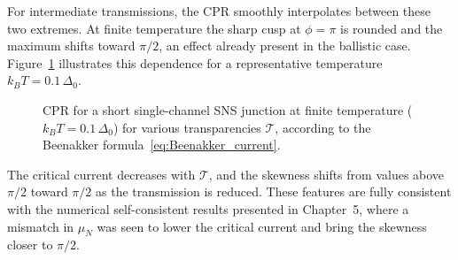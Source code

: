 \documentclass[11pt,a4paper,twoside,openany]{report}
\begin{document}
For intermediate transmissions, the CPR smoothly interpolates between these two
extremes.  At finite temperature the sharp cusp at $\phi=\pi$ is rounded and the
maximum shifts toward $\pi/2$, an effect already present in the ballistic case.
Figure~\ref{fig:cpr_finite_T} illustrates this dependence for a representative
temperature $k_B T = 0.1\,\Delta_0$.

\begin{figure}[H]
  \centering
  \caption{CPR for a short single-channel SNS junction at finite temperature ($k_B T = 0.1\,\Delta_0$) for various transparencies $\mathcal{T}$, according to the Beenakker formula~\eqref{eq:Beenakker_current}.}
  \label{fig:cpr_finite_T}
\end{figure}

The critical current decreases with $\mathcal{T}$, and the skewness shifts from values above $\pi/2$ toward $\pi/2$ as the transmission is reduced.  These features are fully consistent with the numerical self-consistent results presented in Chapter~5, where a mismatch in $\mu_N$ was seen to lower the critical current and bring the skewness closer to $\pi/2$.
\end{document}
